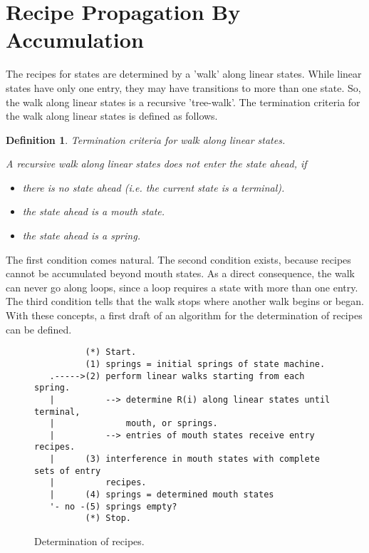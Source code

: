\documentclass[12pt,a4paper]{scrartcl}
\theoremstyle{break}
\newtheorem{definition}{Definition}
\begin{document}
%
\section{Recipe Propagation By Accumulation}

The recipes for states are determined by a 'walk' along linear states. While
linear states have only one entry, they may have transitions to more than one
state. So, the walk along linear states is a recursive 'tree-walk'. The
termination criteria for the walk along linear states is defined as follows.

\begin{definition}
Termination criteria for walk along linear states.

A recursive walk along linear states does not enter the
state ahead, if 

\begin{itemize}
    \item there is no state ahead (i.e. the current state is a terminal).
    \item the state ahead is a mouth state.
    \item the state ahead is a spring.
\end{itemize}
\end{definition}

The first condition comes natural. The second condition exists, because recipes
cannot be accumulated beyond mouth states. As a direct consequence, the walk
can never go along loops, since a loop requires a state with more than one
entry. The third condition tells that the walk stops where another walk begins
or began.  With these concepts, a first draft of an algorithm for the
determination of recipes can be defined.

\begin{figure}[htbp] \leavevmode
\begin{verbatim}
          (*) Start.
          (1) springs = initial springs of state machine.
   .----->(2) perform linear walks starting from each spring.
   |          --> determine R(i) along linear states until terminal,
   |              mouth, or springs.
   |          --> entries of mouth states receive entry recipes.
   |      (3) interference in mouth states with complete sets of entry
   |          recipes.
   |      (4) springs = determined mouth states
   '- no -(5) springs empty?
          (*) Stop.
\end{verbatim}

\caption{Determination of recipes.}
\end{figure}
\end{document}
